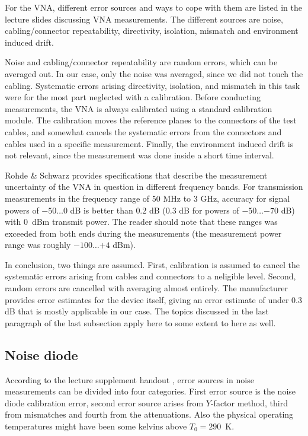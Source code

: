 \documentclass[a4paper, 12pt]{article}
\begin{document}
For the VNA, different error sources and ways to cope with them are listed in the 
lecture slides discussing VNA measurements. The different sources are noise, 
cabling/connector repeatability, directivity, isolation, mismatch and environment 
induced drift. 

Noise and cabling/connector repeatability are random errors, which can be averaged 
out. In our case, only the noise was averaged, since we did not touch the cabling. 
Systematic errors arising directivity, isolation, and mismatch in this task were
for the most part neglected with a calibration. Before conducting measurements, 
the VNA is always calibrated using a standard calibration module. The calibration 
moves the reference planes to the connectors of the test cables, and somewhat 
cancels the systematic errors from the connectors and cables used in a specific 
measurement. Finally, the environment induced drift is not relevant, since the 
measurement was done inside a short time interval.

Rohde \& Schwarz provides specifications that describe the measurement uncertainty 
of the VNA in question in different frequency bands. For transmission measurements 
in the frequency range of 50 MHz to 3 GHz, accuracy for signal powers of $-50 \ldots 0$ 
dB is better than $0.2$ dB ($0.3$ dB for powers of $-50 \ldots {-70}$ dB) with 0~dBm 
transmit power. \cite{vna} The reader should note that these ranges was exceeded 
from both ends during the measurements (the measurement power range was roughly 
$-100 \ldots {+4}$ dBm). 

In conclusion, two things are assumed. First, calibration is assumed to cancel the 
systematic errors arising from cables and connectors to a neligible level. Second, 
random errors are cancelled with averaging almost entirely. The manufacturer provides 
error estimates for the device itself, giving an error estimate of under $0.3$ dB that 
is mostly applicable in our case. The topics discussed in the last paragraph of the 
last subsection apply here to some extent to here as well.


\subsection{Noise diode}

According to the lecture supplement handout \cite{kakkaa_huuleen}, error sources in noise 
measurements can be divided into four categories. First error source is the noise diode 
calibration error, second error source arises from $Y$-factor method, third from mismatches 
and fourth from the attenuations. Also the physical operating temperatures might have been 
some kelvins above $T_0 = 290$~K.
\end{document}
